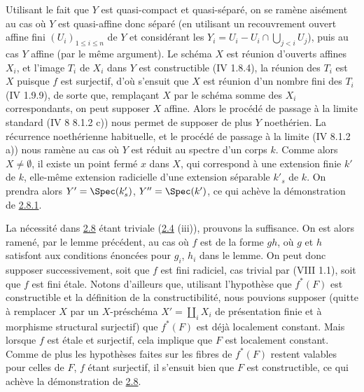 \documentclass[10pt]{../fichiers-configuration-latex/smfart}
\begin{document}
Utilisant le fait que $Y$ est quasi-compact et quasi-séparé, on se
ramène aisément au cas où $Y$ est quasi-affine donc séparé (en
utilisant un recouvrement ouvert affine fini $(U_i)_{1\leq i\leq n}$
de $Y$ et considérant les $Y_i=U_i-U_i\cap \bigcup_{j< i} U_j$), puis
au cas $Y$ affine (par le même argument). Le schéma $X$ est réunion
d'ouverts affines $X_i$, et l'image $T_i$ de $X_i$ dans $Y$ est
constructible (\EGA IV 1.8.4), la réunion des $T_i$ est $X$ puisque $f$
est surjectif, d'où s'ensuit que $X$ est réunion d'un nombre fini des
$T_i$ (\EGA IV 1.9.9), de sorte que, remplaçant $X$ par le schéma
somme des $X_i$ correspondants, on peut supposer $X$ affine. Alors le
procédé de passage à la limite standard (\EGA IV 8 8.1.2 c)) nous
permet de supposer de plus $Y$ noethérien. La récurrence noethérienne
habituelle, et le procédé de passage à la limite (\EGA IV 8.1.2 a))
nous ramène au cas où $Y$ est réduit au spectre d'un corps $k$. Comme
alors $X\neq ∅$, il existe un point fermé $x$ dans $X$, qui
correspond à une extension finie $k'$ de $k$, elle-même extension
radicielle d'une extension séparable $k'_s$ de $k$. On prendra alors
$Y'=\Spec(k'_s)$, $Y''=\Spec(k')$, ce qui achève la démonstration de
\hyperref[IX.lem2.8.1]{2.8.1}.

La nécessité dans \hyperref[IX.prop2.8]{2.8} étant triviale (\hyperref[IX.prop2.4]{2.4} (iii)), prouvons la
suffisance. On est alors ramené, par le lemme précédent, au cas où $f$
est de la forme $gh$, où $g$ et $h$ satisfont aux conditions énoncées
pour $g_i$, $h_i$ dans le lemme. On peut donc supposer successivement,
soit que $f$ est fini radiciel, cas trivial par (VIII 1.1), soit que
$f$ est fini étale. Notons d'ailleurs que, utilisant l'hypothèse que
$f^{\ast}(F)$ est constructible et la définition de la
constructibilité, nous pouvions supposer (quitte à remplacer $X$ par
un $X$-préschéma $X'=\coprod_i X_i$ de présentation finie et à
morphisme structural surjectif) que $f^{\ast}(F)$ est déjà localement
constant. Mais lorsque $f$ est étale et surjectif, cela implique que
$F$ est localement constant. Comme de plus les hypothèses faites sur
les fibres de $f^{\ast}(F)$ restent valables pour celles de $F$, $f$
étant surjectif, il s'ensuit bien que $F$ est constructible, ce qui
achève la démonstration de \hyperref[IX.prop2.8]{2.8}.
\end{document}
